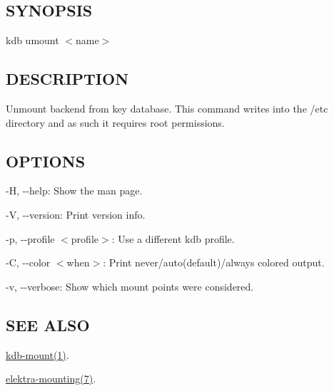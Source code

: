 \subsection*{S\+Y\+N\+O\+P\+S\+IS}

{\ttfamily kdb umount $<$name$>$}

\subsection*{D\+E\+S\+C\+R\+I\+P\+T\+I\+ON}

Unmount backend from key database. This command writes into the {\ttfamily /etc} directory and as such it requires root permissions.

\subsection*{O\+P\+T\+I\+O\+NS}


\begin{DoxyItemize}
\item {\ttfamily -\/H}, {\ttfamily -\/-\/help}\+: Show the man page.
\item {\ttfamily -\/V}, {\ttfamily -\/-\/version}\+: Print version info.
\item {\ttfamily -\/p}, {\ttfamily -\/-\/profile $<$profile$>$}\+: Use a different kdb profile.
\item {\ttfamily -\/C}, {\ttfamily -\/-\/color $<$when$>$}\+: Print never/auto(default)/always colored output.
\item {\ttfamily -\/v}, {\ttfamily -\/-\/verbose}\+: Show which mount points were considered.
\end{DoxyItemize}

\subsection*{S\+EE A\+L\+SO}


\begin{DoxyItemize}
\item \hyperlink{doc_help_kdb-mount_md}{kdb-\/mount(1)}.
\item \hyperlink{doc_help_elektra-mounting_md}{elektra-\/mounting(7)}. 
\end{DoxyItemize}
